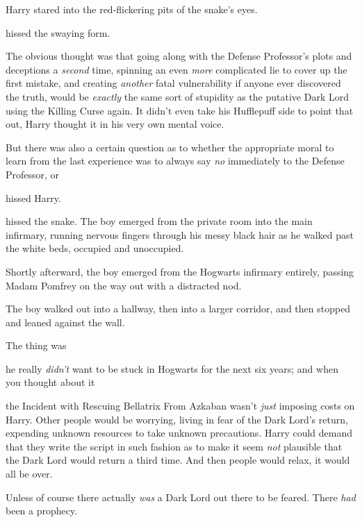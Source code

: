 Harry stared into the red-flickering pits of the snake's eyes.

 hissed the swaying form.

The obvious thought was that going along with the Defense Professor's plots and
deceptions a \emph{second} time, spinning an even \emph{more} complicated lie
to cover up the first mistake, and creating \emph{another} fatal vulnerability
if anyone ever discovered the truth, would be \emph{exactly} the same sort of
stupidity as the putative Dark Lord using the Killing Curse again. It didn't
even take his Hufflepuff side to point that out, Harry thought it in his very
own mental voice.

But there was also a certain question as to whether the appropriate moral to
learn from the last experience was to always say \emph{no} immediately to the
Defense Professor, or{\el}

 hissed Harry. 

 hissed the snake. 
\sbreak
The boy emerged from the private room into the main infirmary, running nervous
fingers through his messy black hair as he walked past the white beds, occupied
and unoccupied.

Shortly afterward, the boy emerged from the Hogwarts infirmary entirely,
passing Madam Pomfrey on the way out with a distracted nod.

The boy walked out into a hallway, then into a larger corridor, and then
stopped and leaned against the wall.

The thing was{\el}

{\el} he really \emph{didn't} want to be stuck in Hogwarts for the next six
years; and when you thought about it{\el}

{\el} the Incident with Rescuing Bellatrix From Azkaban wasn't \emph{just}
imposing costs on Harry. Other people would be worrying, living in fear of the
Dark Lord's return, expending unknown resources to take unknown precautions.
Harry could demand that they write the script in such fashion as to make it
seem \emph{not} plausible that the Dark Lord would return a third time. And
then people would relax, it would all be over.

Unless of course there actually \emph{was} a Dark Lord out there to be feared.
There \emph{had} been a prophecy.

